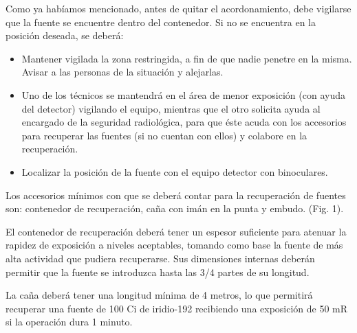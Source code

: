 
Como ya habíamos mencionado, antes de quitar el acordonamiento, debe vigilarse que la fuente se encuentre dentro del contenedor. Si no se encuentra en la posición deseada, se deberá:

\begin{itemize}
  \item[a)] Mantener vigilada la zona restringida, a fin de que nadie penetre en la misma. Avisar a las personas de la situación y alejarlas.
  \item[b)] Uno de los técnicos se mantendrá en el área de menor exposición (con ayuda del detector) vigilando el equipo, mientras que el otro solicita ayuda al encargado de la seguridad radiológica, para que éste acuda con los accesorios para recuperar las fuentes (si no cuentan con ellos) y colabore en la recuperación.
  \item[c)] Localizar la posición de la fuente con el equipo detector con binoculares.
\end{itemize}

Los accesorios mínimos con que se deberá contar para la recuperación de fuentes son: contenedor de recuperación, caña con imán en la punta y embudo. (Fig. 1).

El contenedor de recuperación deberá tener un espesor suficiente para atenuar la rapidez de exposición a niveles aceptables, tomando como base la fuente de más alta actividad que pudiera recuperarse. Sus dimensiones internas deberán permitir que la fuente se introduzca hasta las 3/4 partes de su longitud.

La caña deberá tener una longitud mínima de 4 metros, lo que permitirá recuperar una fuente de 100 Ci de iridio-192 recibiendo una exposición de 50 mR si la operación dura 1 minuto.
